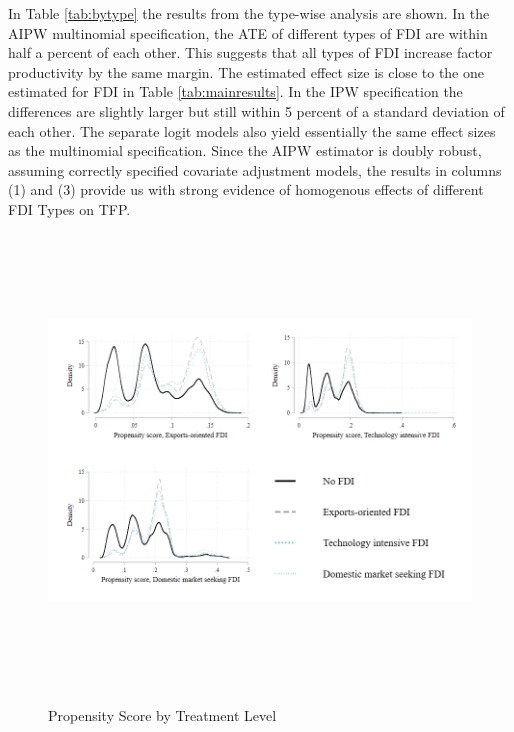 \documentclass[a4paper,11pt]{scrartcl}
\begin{document}
In Table \ref{tab:bytype} the results from the type-wise analysis are shown. In the AIPW multinomial specification, the ATE of different types of FDI are within half a percent of each other. This suggests that all types of FDI increase factor productivity by the same margin. The estimated effect size is close to the one estimated for FDI in Table \ref{tab:mainresults}. In the IPW specification the differences are slightly larger but still within 5 percent of a standard deviation of each other.  The separate logit models also yield essentially the same effect sizes as the multinomial specification. Since the AIPW estimator is doubly robust, assuming correctly specified covariate adjustment models, the results in columns (1) and (3) provide us with strong evidence of homogenous effects of different FDI Types on TFP.


\begin{figure}[h]
	
	\caption{Propensity Score by Treatment Level}
\hspace*{-2cm}  	
	\includegraphics[height=12cm]{overlap_type.png}\\ 
	\label{fig:over_typ}
 
\end{figure}
\end{document}
